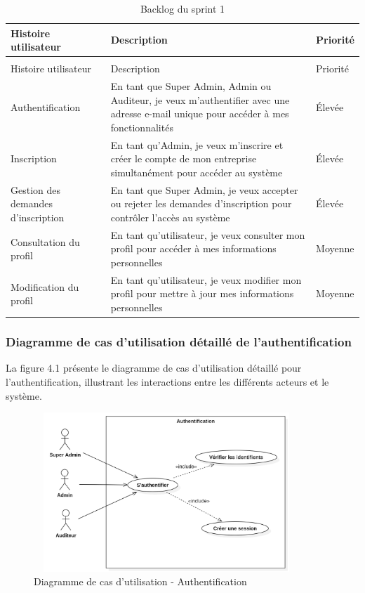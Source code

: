 \begin{longtable}{|>{\raggedright\arraybackslash}p{4cm}|>{\raggedright\arraybackslash}p{7cm}|>{\raggedright\arraybackslash}p{2cm}|}
\caption{Backlog du sprint 1}
\label{tab:sprint1_backlog}\\
\hline
Histoire utilisateur & Description & Priorité \\
\hline
\endfirsthead
\multicolumn{3}{c}{\tablename\ \thetable\ -- suite} \\
\hline
Histoire utilisateur & Description & Priorité \\
\hline
\endhead
Authentification & En tant que Super Admin, Admin ou Auditeur, je veux m'authentifier avec une adresse e-mail unique pour accéder à mes fonctionnalités & Élevée \\
\hline
Inscription & En tant qu'Admin, je veux m'inscrire et créer le compte de mon entreprise simultanément pour accéder au système & Élevée \\
\hline
Gestion des demandes d'inscription & En tant que Super Admin, je veux accepter ou rejeter les demandes d'inscription pour contrôler l'accès au système & Élevée \\
\hline
Consultation du profil & En tant qu'utilisateur, je veux consulter mon profil pour accéder à mes informations personnelles & Moyenne \\
\hline
Modification du profil & En tant qu'utilisateur, je veux modifier mon profil pour mettre à jour mes informations personnelles & Moyenne \\
\hline
\end{longtable}

\subsubsection{Diagramme de cas d'utilisation détaillé de l'authentification}
\noindent La figure 4.1 présente le diagramme de cas d'utilisation détaillé pour l'authentification, illustrant les interactions entre les différents acteurs et le système.

\begin{figure}[H]
    \centering
    \includegraphics[width=10cm,height=6cm]{images/authuc.png}
    \caption{Diagramme de cas d'utilisation - Authentification}
\end{figure}

